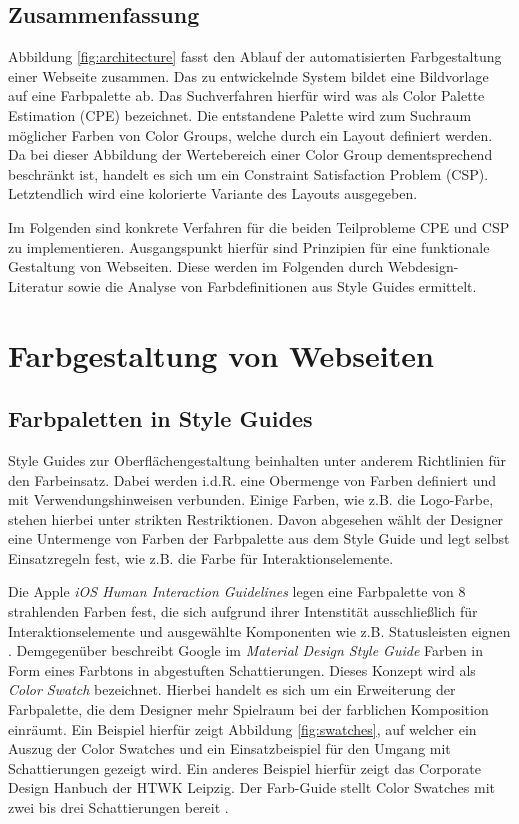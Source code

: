 \documentclass[11pt,a4paper,bibliography=totoc,twocolumn]{scrartcl}
\begin{document}
\subsection*{Zusammenfassung}

Abbildung \ref{fig:architecture} fasst den Ablauf der automatisierten Farbgestaltung einer Webseite zusammen. Das zu entwickelnde System bildet eine Bildvorlage auf eine Farbpalette ab. Das Suchverfahren hierfür wird was als Color Palette Estimation (CPE) bezeichnet. Die entstandene Palette wird zum Suchraum möglicher Farben von Color Groups, welche durch ein Layout definiert werden. Da bei dieser Abbildung der Wertebereich einer Color Group dementsprechend beschränkt ist, handelt es sich um ein Constraint Satisfaction Problem (CSP). Letztendlich wird eine kolorierte Variante des Layouts ausgegeben.

Im Folgenden sind konkrete Verfahren für die beiden Teilprobleme CPE und CSP zu implementieren. Ausgangspunkt hierfür sind Prinzipien für eine funktionale Gestaltung von Webseiten. Diese werden im Folgenden durch Webdesign-Literatur sowie die Analyse von Farbdefinitionen aus Style Guides ermittelt.

\section{Farbgestaltung von Webseiten}

\subsection{Farbpaletten in Style Guides}
\label{sec:swatches}

Style Guides zur Oberflächengestaltung beinhalten unter anderem Richtlinien für den Farbeinsatz. Dabei werden i.d.R. eine Obermenge von Farben definiert und mit Verwendungshinweisen verbunden. Einige Farben, wie z.B. die Logo-Farbe, stehen hierbei unter strikten Restriktionen. Davon abgesehen wählt der Designer eine Untermenge von Farben der Farbpalette aus dem Style Guide und legt selbst Einsatzregeln fest, wie z.B. die Farbe für Interaktionselemente.

Die Apple \emph{iOS Human Interaction Guidelines} legen eine Farbpalette von 8 strahlenden Farben fest, die sich aufgrund ihrer Intenstität ausschließlich für Interaktionselemente und ausgewählte Komponenten wie z.B. Statusleisten eignen \citep{ios}. Demgegenüber beschreibt Google im \emph{Material Design Style Guide} Farben in Form eines Farbtons in abgestuften Schattierungen. Dieses Konzept wird als \emph{Color Swatch} bezeichnet. Hierbei handelt es sich um ein Erweiterung der Farbpalette, die dem Designer mehr Spielraum bei der farblichen Komposition einräumt. Ein Beispiel hierfür zeigt Abbildung \ref{fig:swatches}, auf welcher ein Auszug der Color Swatches und ein Einsatzbeispiel für den Umgang mit Schattierungen gezeigt wird. Ein anderes Beispiel hierfür zeigt das Corporate Design Hanbuch der HTWK Leipzig. Der Farb-Guide stellt Color Swatches mit zwei bis drei Schattierungen bereit \citep{htwk}.
\end{document}
